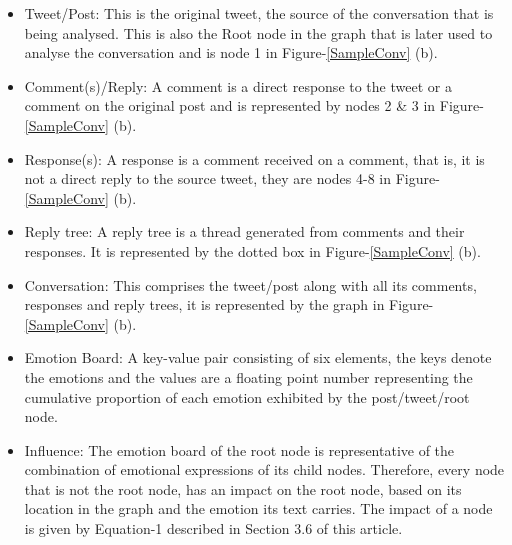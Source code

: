 \documentclass[acmtog]{acmart}
\begin{document}
\begin{itemize}
    \item Tweet/Post: This is the original tweet, the source of the conversation that is being analysed. This is also the Root node in the graph that is later used to analyse the conversation and is node 1 in Figure-\ref{SampleConv} (b).
    \item Comment(s)/Reply: A comment is a direct response to the tweet or a comment on the original post and is represented by nodes 2 \& 3 in Figure-\ref{SampleConv} (b).
    \item Response(s): A response is a comment received on a comment, that is, it is not a direct reply to the source tweet, they are nodes 4-8 in Figure-\ref{SampleConv} (b).
    \item Reply tree:  A reply tree is a thread generated from comments and their responses. It is represented by the dotted box in Figure-\ref{SampleConv} (b).
    \item Conversation: This comprises the tweet/post along with all its comments, responses and reply trees, it is represented by the graph in Figure-\ref{SampleConv} (b).
    \item Emotion Board: A key-value pair consisting of six elements, the keys denote the emotions and the values are a floating point number representing the cumulative proportion of each emotion exhibited by the post/tweet/root node.
    \item Influence: The emotion board of the root node is representative of the combination of emotional expressions of its child nodes. Therefore, every node that is not the root node, has an impact on the root node, based on its location in the graph and the emotion its text carries. The impact of a node is given by Equation-1 described in Section 3.6 of this article. 
\end{itemize}



\end{document}
